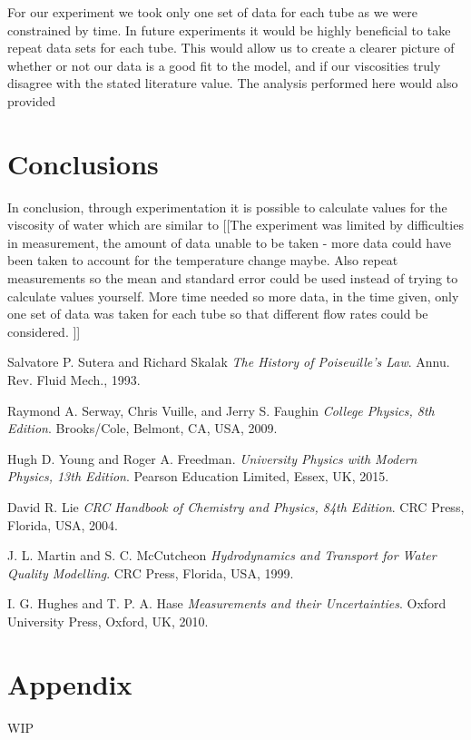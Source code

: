 \documentclass[twocolumn]{revtex4}
\newcommand{\squeezeup}{\vspace{-2.5mm}}
\begin{document}
For our experiment we took only one set of data for each tube as we were constrained by time. In future experiments it would be highly beneficial to take repeat data sets for each tube. This would allow us to create a clearer picture of whether or not our data is a good fit to the model, and if our viscosities truly disagree with the stated literature value. The analysis performed here would also provided 

\vspace{-5ex}
\section{Conclusions}
\vspace{-2ex}
 
In conclusion, through experimentation it is possible to calculate values for the viscosity of water which are similar to [[The experiment was limited by difficulties in measurement, the amount of data unable to be taken - more data could have been taken to account for the temperature change maybe. Also repeat measurements so the mean and standard error could be used instead of trying to calculate values yourself. More time needed so more data, in the time given, only one set of data was taken for each tube so that different flow rates could be considered. ]]

\squeezeup
\squeezeup

\begin{thebibliography}{5}
	Salvatore P. Sutera and Richard Skalak
	\textit{The History of Poiseuille's Law}.
	Annu. Rev. Fluid Mech., 1993.
	
	Raymond A. Serway, Chris Vuille, and Jerry S. Faughin
	\textit{College Physics, 8th Edition}.
	Brooks/Cole, Belmont, CA, USA, 2009.

	Hugh D. Young and Roger A. Freedman.
	\textit{University Physics with Modern Physics, 13th Edition}. 
	Pearson Education Limited, Essex, UK, 2015.
	
	David R. Lie
	\textit{CRC Handbook of Chemistry and Physics, 84th Edition}. 
	CRC Press, Florida, USA, 2004.
	
	J. L. Martin and S. C. McCutcheon
	\textit{Hydrodynamics and Transport for Water Quality Modelling}. 
	CRC Press, Florida, USA, 1999.
	
	I. G. Hughes and T. P. A. Hase
	\textit{Measurements and their Uncertainties}. 
	Oxford University Press, Oxford, UK, 2010.
	
\end{thebibliography}
\clearpage

\vfill
\twocolumngrid
\vspace{-3ex}
\section*{Appendix}
\vspace{-2ex}

WIP

\clearpage
\end{document}
